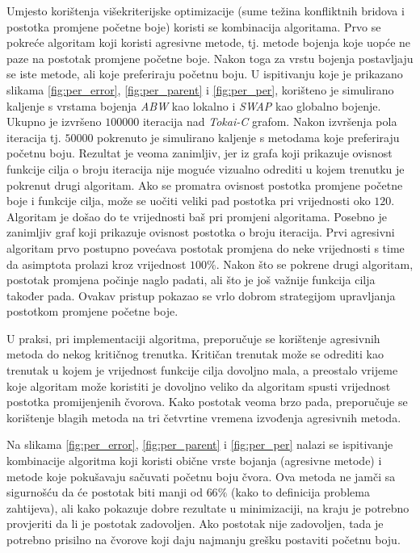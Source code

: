 \documentclass[times, utf8, diplomski, numeric]{fer}
\begin{document}
Umjesto korištenja višekriterijske optimizacije (sume težina konfliktnih bridova i postotka promjene početne boje) koristi se kombinacija algoritama. Prvo se pokreće algoritam koji koristi agresivne metode, tj. metode bojenja koje uopće ne paze na postotak promjene početne boje. Nakon toga za vrstu bojenja postavljaju se iste metode, ali koje preferiraju početnu boju. U ispitivanju koje je prikazano slikama \ref{fig:per_error}, \ref{fig:per_parent} i \ref{fig:per_per}, korišteno je simulirano kaljenje s vrstama bojenja \emph{ABW} kao lokalno i \emph{SWAP} kao globalno bojenje. Ukupno je izvršeno $100000$ iteracija nad \emph{Tokai-C} grafom. Nakon izvršenja pola iteracija tj. $50000$ pokrenuto je simulirano kaljenje s metodama koje preferiraju početnu boju. Rezultat je veoma zanimljiv, jer iz grafa koji prikazuje ovisnost funkcije cilja o broju iteracija nije moguće vizualno odrediti u kojem trenutku je pokrenut drugi algoritam. Ako se promatra ovisnost postotka promjene početne boje i funkcije cilja, može se uočiti veliki pad postotka pri vrijednosti oko $120$. Algoritam je došao do te vrijednosti baš pri promjeni algoritama. Posebno je zanimljiv graf koji prikazuje ovisnost postotka o broju iteracija. Prvi agresivni algoritam prvo postupno povećava postotak promjena do neke vrijednosti s time da asimptota prolazi kroz vrijednost $100\%$. Nakon što se pokrene drugi algoritam, postotak promjena počinje naglo padati, ali što je još važnije funkcija cilja također pada. Ovakav pristup pokazao se vrlo dobrom strategijom upravljanja postotkom promjene početne boje.

U praksi, pri implementaciji algoritma, preporučuje se korištenje agresivnih metoda do nekog kritičnog trenutka. Kritičan trenutak može se odrediti kao trenutak u kojem je vrijednost funkcije cilja dovoljno mala, a preostalo vrijeme koje algoritam može koristiti je dovoljno veliko da algoritam spusti vrijednost postotka promijenjenih čvorova. Kako postotak veoma brzo pada, preporučuje se korištenje blagih metoda na tri četvrtine vremena izvođenja agresivnih metoda.

Na slikama \ref{fig:per_error}, \ref{fig:per_parent} i \ref{fig:per_per} nalazi se ispitivanje kombinacije algoritma koji koristi obične vrste bojanja (agresivne metode) i metode koje pokušavaju sačuvati početnu boju čvora. Ova metoda ne jamči sa sigurnošću da će postotak biti manji od $66\%$ (kako to definicija problema zahtijeva), ali kako pokazuje dobre rezultate u minimizaciji, na kraju je potrebno provjeriti da li je postotak zadovoljen. Ako postotak nije zadovoljen, tada je potrebno prisilno na čvorove koji daju najmanju grešku postaviti početnu boju.
\end{document}
